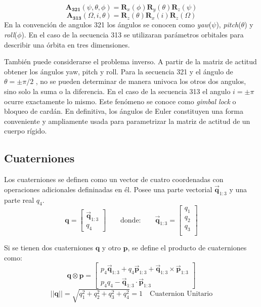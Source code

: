 \begin{equation}
		\mathbf{A_{321}}(\psi,\theta,\phi) = \mathbf{R}_x(\phi) \mathbf{R}_y(\theta) \mathbf{R}_z(\psi)
\end{equation}
\begin{equation} %
		\mathbf{A_{313}}(\Omega,i,\theta) = \mathbf{R}_z(\theta) \mathbf{R}_x(i) \mathbf{R}_z(\Omega)
\end{equation}
En la convención de angulos 321 los ángulos se conocen como \textit{yaw}($\psi$), \textit{pitch}($\theta$) y \textit{roll}($\phi$). En el caso de la secuencia 313 se utilizaran parámetros orbitales para describir una órbita en tres dimensiones. 

También puede considerarse el problema inverso. A partir de la matriz de actitud obtener los ángulos yaw, pitch y roll. Para la secuencia 321 y el ángulo de $\theta =\pm \pi/2$ , no se pueden determinar de manera univoca los otros dos angulos, sino solo la suma o la diferencia. En el caso de la secuencia 313 el angulo $i = \pm \pi$ ocurre exactamente lo mismo. Este fenómeno se conoce como \textit{gimbal lock} o bloqueo de cardán. En definitiva, los ángulos de Euler constituyen una forma conveniente y ampliamente usada para parametrizar la matriz de actitud de un cuerpo rígido.


\subsection{Cuaterniones}
Los cuaterniones se definen como un vector de cuatro coordenadas con operaciones adicionales defininadas en él. Posee una parte vectorial $\vec{\mathbf{q}}_{1:3}$ y una parte real $q_4$.
\begin{equation}
	\mathbf{q} = \begin{bmatrix}
		\vec{\mathbf{q}}_{1:3} \\ 
		q_4
	\end{bmatrix}
	\qquad \text{donde:}
	\qquad
	\vec{\mathbf{q}}_{1:3} =  
	\begin{bmatrix}
		q_1 \\
		q_2 \\ 
		q_3 \\
	\end{bmatrix}
\end{equation}

Si se tienen dos cuaterniones $\mathbf{q}$ y otro $\mathbf{p}$, se define el producto de cuaterniones como: 
\begin{equation}
	\mathbf{q} \otimes \mathbf{p} = \begin{bmatrix}
		p_4 \vec{\mathbf{q}}_{1:3}+q_4\vec{\mathbf{p}}_{1:3} + \vec{\mathbf{q}}_{1:3} \times \vec{\mathbf{p}}_{1:3}\\
		p_4 q_4 - 	\vec{\mathbf{q}}_{1:3} \cdot 	\vec{\mathbf{p}}_{1:3}
	\end{bmatrix}
\end{equation} 
\begin{equation}
||\mathbf{q}|| = \sqrt{q_1^2 + q_2^2 + q_3^2 + q_4^2 } = 1  \quad \text{Cuaternion Unitario}
\end{equation}

